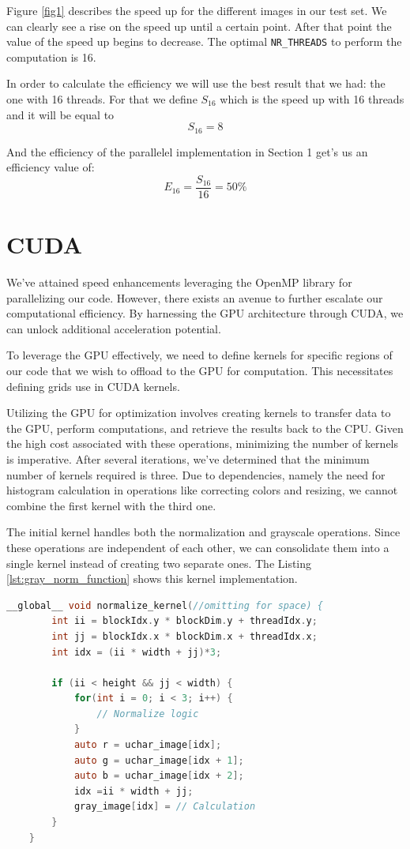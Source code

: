 \documentclass[sigconf]{acmart}
\begin{document}
Figure \ref{fig1} describes the speed up for the different images in our test set. We can clearly see a rise on the speed up until a certain point. After that point the value of the speed up begins to decrease. The optimal \texttt{NR\_THREADS} to perform the computation is 16.

In order to calculate the efficiency we will use the best result that we had: the one with 16 threads. For that we define $S_{16}$ which is the speed up with 16 threads and it will be equal to $$S_{16}=8$$

And the efficiency of the parallelel implementation in Section 1 get's us an efficiency value of: $$E_{16} = \frac{S_{16}}{16} = 50\%$$

\section{CUDA}
We've attained speed enhancements leveraging the OpenMP library for parallelizing our code. However, there exists an avenue to further escalate our computational efficiency. By harnessing the GPU architecture through CUDA, we can unlock additional acceleration potential.

To leverage the GPU effectively, we need to define kernels for specific regions of our code that we wish to offload to the GPU for computation. This necessitates defining grids use in CUDA kernels.

Utilizing the GPU for optimization involves creating kernels to transfer data to the GPU, perform computations, and retrieve the results back to the CPU. Given the high cost associated with these operations, minimizing the number of kernels is imperative. After several iterations, we've determined that the minimum number of kernels required is three. Due to dependencies, namely the need for histogram calculation in operations like correcting colors and resizing, we cannot combine the first kernel with the third one.

The initial kernel handles both the normalization and grayscale operations. Since these operations are independent of each other, we can consolidate them into a single kernel instead of creating two separate ones. The Listing \ref{lst:gray_norm_function} shows this kernel implementation.

\begin{lstlisting}[language=C, caption=Grey Conversion and Normalization, label={lst:gray_norm_function}]
__global__ void normalize_kernel(//omitting for space) {
        int ii = blockIdx.y * blockDim.y + threadIdx.y;
        int jj = blockIdx.x * blockDim.x + threadIdx.x;
        int idx = (ii * width + jj)*3;

        if (ii < height && jj < width) {
            for(int i = 0; i < 3; i++) {
                // Normalize logic
            }
            auto r = uchar_image[idx];
            auto g = uchar_image[idx + 1];
            auto b = uchar_image[idx + 2];
            idx =ii * width + jj;
            gray_image[idx] = // Calculation
        }
    }
\end{lstlisting}
\end{document}

